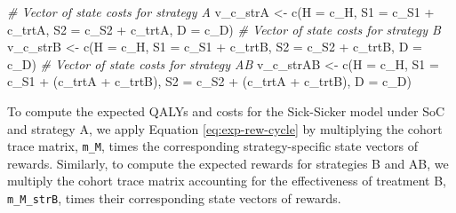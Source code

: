 \documentclass[
]{article}
\newenvironment{Shaded}{\begin{snugshade}}{\end{snugshade}}
\newcommand{\AttributeTok}[1]{\textcolor[rgb]{0.77,0.63,0.00}{#1}}
\newcommand{\CommentTok}[1]{\textcolor[rgb]{0.56,0.35,0.01}{\textit{#1}}}
\newcommand{\FunctionTok}[1]{\textcolor[rgb]{0.00,0.00,0.00}{#1}}
\newcommand{\NormalTok}[1]{#1}
\newcommand{\OtherTok}[1]{\textcolor[rgb]{0.56,0.35,0.01}{#1}}
\newcommand{\SpecialCharTok}[1]{\textcolor[rgb]{0.00,0.00,0.00}{#1}}
\begin{document}
\begin{Shaded}
\begin{Highlighting}[]
\CommentTok{\# Vector of state costs for strategy A}
\NormalTok{v\_c\_strA }\OtherTok{\textless{}{-}} \FunctionTok{c}\NormalTok{(}\AttributeTok{H  =}\NormalTok{ c\_H, }
              \AttributeTok{S1 =}\NormalTok{ c\_S1 }\SpecialCharTok{+}\NormalTok{ c\_trtA, }
              \AttributeTok{S2 =}\NormalTok{ c\_S2 }\SpecialCharTok{+}\NormalTok{ c\_trtA, }
              \AttributeTok{D  =}\NormalTok{ c\_D)}
\CommentTok{\# Vector of state costs for strategy B}
\NormalTok{v\_c\_strB }\OtherTok{\textless{}{-}} \FunctionTok{c}\NormalTok{(}\AttributeTok{H  =}\NormalTok{ c\_H, }
              \AttributeTok{S1 =}\NormalTok{ c\_S1 }\SpecialCharTok{+}\NormalTok{ c\_trtB, }
              \AttributeTok{S2 =}\NormalTok{ c\_S2 }\SpecialCharTok{+}\NormalTok{ c\_trtB, }
              \AttributeTok{D  =}\NormalTok{ c\_D)}
\CommentTok{\# Vector of state costs for strategy AB}
\NormalTok{v\_c\_strAB }\OtherTok{\textless{}{-}} \FunctionTok{c}\NormalTok{(}\AttributeTok{H  =}\NormalTok{ c\_H, }
               \AttributeTok{S1 =}\NormalTok{ c\_S1 }\SpecialCharTok{+}\NormalTok{ (c\_trtA }\SpecialCharTok{+}\NormalTok{ c\_trtB), }
               \AttributeTok{S2 =}\NormalTok{ c\_S2 }\SpecialCharTok{+}\NormalTok{ (c\_trtA }\SpecialCharTok{+}\NormalTok{ c\_trtB), }
               \AttributeTok{D  =}\NormalTok{ c\_D)}
\end{Highlighting}
\end{Shaded}

To compute the expected QALYs and costs for the Sick-Sicker model under SoC and strategy A, we apply Equation \eqref{eq:exp-rew-cycle} by multiplying the cohort trace matrix, \texttt{m\_M}, times the corresponding strategy-specific state vectors of rewards. Similarly, to compute the expected rewards for strategies B and AB, we multiply the cohort trace matrix accounting for the effectiveness of treatment B, \texttt{m\_M\_strB}, times their corresponding state vectors of rewards.
\end{document}
